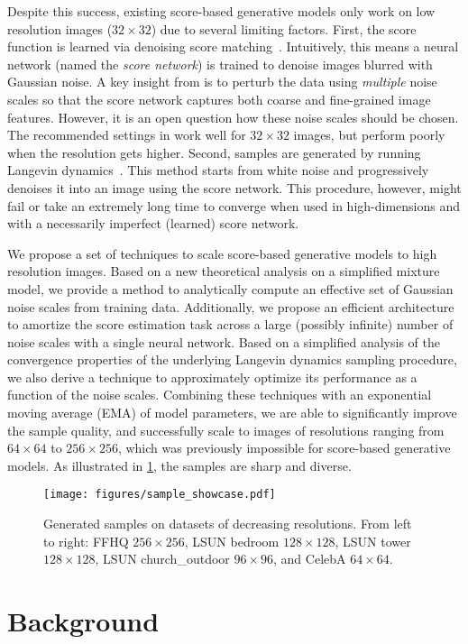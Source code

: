 \documentclass{article}
\begin{document}
Despite this success, existing score-based generative models only work on low resolution images ($32\times 32$) due to several limiting factors. 
First, the score function is learned via denoising score matching~\cite{hyvarinen2005estimation,vincent2011connection,raphan2011least}. Intuitively, this means a  neural network (named the \emph{score network}) is trained to denoise images blurred with Gaussian noise. A key insight from \cite{song2019generative} is to perturb the data using \emph{multiple} noise scales so that the score network captures both coarse and fine-grained image features. However, it is an open question how these noise scales should be chosen. The recommended settings in \cite{song2019generative} work well for $32\times 32$ images, but perform poorly when the resolution gets higher. Second, samples are generated by running Langevin dynamics~\cite{roberts1996exponential,welling2011bayesian}. This method starts from white noise and progressively denoises it into an image using the score network. This procedure, however, might fail or take an extremely long time to converge when used in high-dimensions and with a necessarily imperfect (learned) score network. 






We propose a set of techniques to scale score-based generative models to high resolution images. Based on a new theoretical analysis on a simplified mixture model, we provide a method to analytically compute an effective set of Gaussian noise scales from training data. Additionally, we propose an efficient architecture to amortize the score estimation task across a large (possibly infinite) number of noise scales with a single neural network. Based on a simplified analysis of the convergence properties of the underlying Langevin dynamics sampling procedure, we also derive a technique to approximately optimize its performance as a function of the noise scales. 
Combining these techniques with an exponential moving average (EMA) of model parameters, we are able to significantly improve the sample quality, and successfully scale to images of resolutions ranging from $64\times 64$ to $256\times 256$, which was previously impossible for score-based generative models. As illustrated in \cref{fig:showcase}, the samples are sharp and diverse. 


\begin{figure}
    \centering
    \texttt{[image: figures/sample\_showcase.pdf]}
    \caption{Generated samples on datasets of decreasing resolutions. From left to right: FFHQ $256\times 256$, LSUN bedroom $128\times 128$, LSUN tower $128\times 128$, LSUN church\_outdoor $96\times 96$, and CelebA $64\times 64$.}
    \label{fig:showcase}
\end{figure} \section{Background}\label{sec:background}
\end{document}
